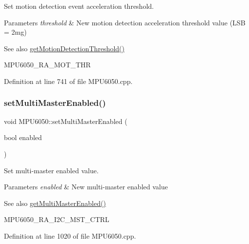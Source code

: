 Set motion detection event acceleration threshold. 


\begin{DoxyParams}{Parameters}
{\em threshold} & New motion detection acceleration threshold value (L\+SB = 2mg) \\
\hline
\end{DoxyParams}
\begin{DoxySeeAlso}{See also}
\mbox{\hyperlink{classMPU6050_ab7a825b1b8b86cebda308289630795e7}{get\+Motion\+Detection\+Threshold()}} 

M\+P\+U6050\+\_\+\+R\+A\+\_\+\+M\+O\+T\+\_\+\+T\+HR 
\end{DoxySeeAlso}


Definition at line 741 of file M\+P\+U6050.\+cpp.

\mbox{\label{classMPU6050_a039f5724974c5bf3f373ed9be031441c}} 
\subsubsection{\texorpdfstring{setMultiMasterEnabled()}{setMultiMasterEnabled()}}
{\footnotesize\ttfamily void M\+P\+U6050\+::set\+Multi\+Master\+Enabled (\begin{DoxyParamCaption}\item[{bool}]{enabled }\end{DoxyParamCaption})}



Set multi-\/master enabled value. 


\begin{DoxyParams}{Parameters}
{\em enabled} & New multi-\/master enabled value \\
\hline
\end{DoxyParams}
\begin{DoxySeeAlso}{See also}
\mbox{\hyperlink{classMPU6050_aa88483068837bd9bc9c9f6c59a7a79b7}{get\+Multi\+Master\+Enabled()}} 

M\+P\+U6050\+\_\+\+R\+A\+\_\+\+I2\+C\+\_\+\+M\+S\+T\+\_\+\+C\+T\+RL 
\end{DoxySeeAlso}


Definition at line 1020 of file M\+P\+U6050.\+cpp.

\mbox{\label{classMPU6050_a7d03801d6b656e8e12cd3c1dd97824a8}} 
